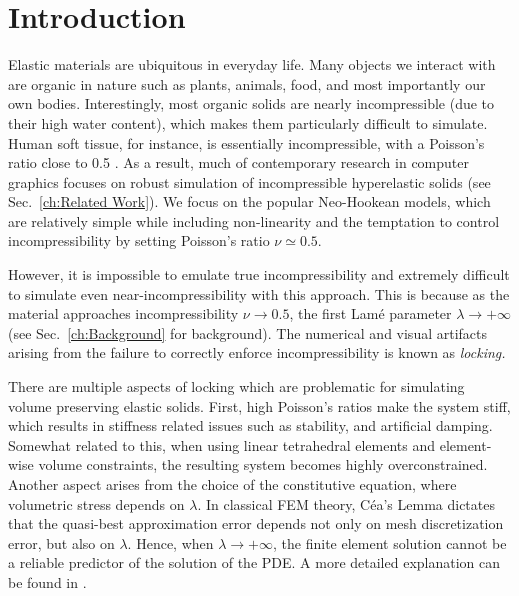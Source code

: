 
\chapter{Introduction}
\label{ch:Introduction}

Elastic materials are ubiquitous in everyday life. Many objects we
interact with are organic in nature such as plants, animals, food, and
most importantly our own bodies. Interestingly, most organic solids
are nearly incompressible (due to their high water content), which
makes them particularly difficult to simulate. Human soft tissue, for
instance, is essentially incompressible, with a Poisson's ratio close
to 0.5 \cite{fung2013biomechanics}. As a result, much of contemporary
research in computer graphics focuses on robust simulation of
incompressible hyperelastic solids (see Sec.~\ref{ch:Related Work}). We
focus on the popular Neo-Hookean models, which are relatively simple
while including non-linearity and the temptation to control
incompressibility by setting Poisson's ratio $\nu \simeq 0.5$.


However, it is impossible to emulate true incompressibility and
extremely difficult to simulate even near-incompressibility with this
approach.  This is because as the material approaches
incompressibility $\nu \rightarrow 0.5$, the first Lam\'e parameter
$\lambda \rightarrow +\infty$ (see Sec.~\ref{ch:Background} for
background). The numerical and visual artifacts arising from the failure
to correctly enforce incompressibility is known as {\em locking.}

There are multiple aspects of locking which are problematic for
simulating volume preserving elastic solids.  First, high Poisson's
ratios make the system stiff, which results in stiffness related
issues such as stability, and artificial damping.  Somewhat related to
this, when using linear tetrahedral elements and element-wise volume
constraints, the resulting system becomes highly overconstrained.
Another aspect
arises from the choice of the constitutive equation, where volumetric
stress depends on $\lambda$.  In classical FEM theory, C\'ea's Lemma
dictates that the quasi-best approximation error depends not only on
mesh discretization error, but also on $\lambda$. Hence, when
$\lambda \rightarrow +\infty$, the finite element solution cannot be a
reliable predictor of the solution of the PDE. A more detailed
explanation can be found in \cite{Braess:2007}.

